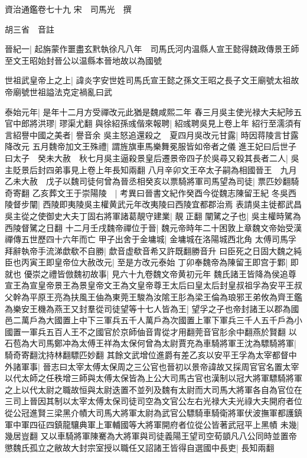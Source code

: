 資治通鑑卷七十九
宋　司馬光　撰

胡三省　音註

晉紀一|{
	起旃蒙作噩盡玄黓執徐凡八年　司馬氏河内温縣人宣王懿得魏政傳景王師至文王昭始封晉公以温縣本晉地故以為國號}


世祖武皇帝上之上|{
	諱炎字安世姓司馬氏宣王懿之孫文王昭之長子文王廟號太祖故帝廟號世祖謚法克定禍亂曰武}


泰始元年|{
	是年十二月方受禪改元此猶是魏咸熙二年}
春三月吳主使光禄大夫紀陟五官中郎將洪璆|{
	璆渠尤翻}
與徐紹孫彧偕來報聘|{
	紹彧聘吳見上卷上年}
紹行至濡須有言紹譽中國之美者|{
	譽音余}
吳主怒追還殺之　夏四月吳改元甘露|{
	時因蒋陵言甘露降改元}
五月魏帝加文王殊禮|{
	謂旌旗車馬樂舞冕服皆如帝者之儀}
進王妃曰后世子曰太子　癸未大赦　秋七月吳主逼殺景皇后遷景帝四子於吳尋又殺其長者二人|{
	吳主貶景后封四弟事見上卷上年長知兩翻}
八月辛卯文王卒太子嗣為相國晉王　九月乙未大赦　戊子以魏司徒何曾為晉丞相癸亥以票騎將軍司馬望為司徒|{
	票匹妙翻騎奇寄翻}
乙亥葬文王于崇陽陵　|{
	考異曰晉書文紀作癸酉今從魏志陳留王紀}
冬吳西陵督步闡|{
	西陵即夷陵吳主權黄武元年改夷陵曰西陵宜都郡治焉}
表請吳主徙都武昌吳主從之使御史大夫丁固右將軍諸葛靚守建業|{
	靚正翻}
闡騭之子也|{
	吳主權時騭為西陵督騭之日翻}
十二月壬戌魏帝禪位于晉|{
	魏元帝時年二十困敦上章魏文帝始受漢禪傳五世歷四十六年而亡}
甲子出舍于金墉城|{
	金墉城在洛陽城西北角}
太傅司馬孚拜辭執帝手流涕歔欷不自勝|{
	歔音虚欷音希又許既翻勝音升}
曰臣死之日固大魏之純臣也丙寅王即皇帝位大赦改元|{
	至是方改元泰始}
丁卯奉魏帝為陳留王即宫于鄴|{
	即就也}
優崇之禮皆倣魏初故事|{
	見六十九卷魏文帝黄初元年}
魏氏諸王皆降為侯追尊宣王為宣皇帝景王為景皇帝文王為文皇帝尊王太后曰皇太后封皇叔祖孚為安平王叔父幹為平原王亮為扶風王伷為東莞王駿為汝隂王肜為梁王倫為琅邪王弟攸為齊王鑑為樂安王機為燕王又封羣從司徒望等十七人皆為王|{
	望孚之子也帝封諸王以郡為國邑二萬戶為大國置上中下三軍兵五千人萬戶為次國置上軍下軍兵三千人五千戶為小國置一軍兵五百人王不之國官於京師伷音胄從才用翻莞音官肜余中翻燕於賢翻}
以石苞為大司馬鄭冲為太傅王祥為太保何曾為太尉賈充為車騎將軍王沈為驃騎將軍|{
	騎奇寄翻沈持林翻驃匹妙翻}
其餘文武增位進爵有差乙亥以安平王孚為太宰都督中外諸軍事|{
	晉志曰太宰太傅太保周之三公官也晉初以景帝諱故又採周官官名置太宰以代太師之任秩增三師與太傅太保皆為上公大司馬古官也漢制以冠大將軍驃騎將軍之上以代太尉之職故恒與太尉迭置不並列及魏有太尉而大司馬大將軍各自為官位在三司上晉因其制以太宰太傅太保司徒司空為文官公左右光禄大夫光祿大夫開府者位從公冠進賢三梁黑介幘大司馬大將軍太尉為武官公驃騎車騎衛將軍伏波撫軍都護鎮軍中軍四征四鎮龍驤典軍上軍輔國等大將軍開府者位從公皆著武冠平上黑幘}
未幾|{
	幾居豈翻}
又以車騎將軍陳騫為大將軍與司徒義陽王望司空荀顗凡八公同時並置帝懲魏氏孤立之敝故大封宗室授以職任又詔諸王皆得自選國中長吏|{
	長知兩翻}
